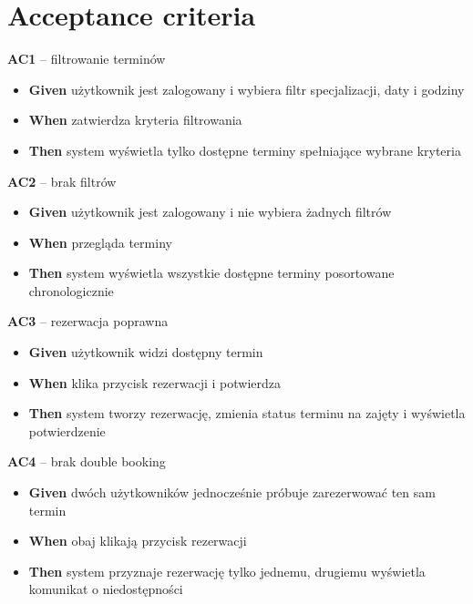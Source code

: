 \documentclass[12pt,a4paper]{article}
\begin{document}
\section{Acceptance criteria}

\textbf{AC1} -- filtrowanie terminów
\begin{itemize}[itemsep=2pt]
  \item \textbf{Given} użytkownik jest zalogowany i wybiera filtr specjalizacji, daty i godziny
  \item \textbf{When} zatwierdza kryteria filtrowania
  \item \textbf{Then} system wyświetla tylko dostępne terminy spełniające wybrane kryteria
\end{itemize}

\vspace{0.4em}
\textbf{AC2} -- brak filtrów
\begin{itemize}[itemsep=2pt]
  \item \textbf{Given} użytkownik jest zalogowany i nie wybiera żadnych filtrów
  \item \textbf{When} przegląda terminy
  \item \textbf{Then} system wyświetla wszystkie dostępne terminy posortowane chronologicznie
\end{itemize}

\vspace{0.4em}
\textbf{AC3} -- rezerwacja poprawna
\begin{itemize}[itemsep=2pt]
  \item \textbf{Given} użytkownik widzi dostępny termin
  \item \textbf{When} klika przycisk rezerwacji i potwierdza
  \item \textbf{Then} system tworzy rezerwację, zmienia status terminu na zajęty i wyświetla potwierdzenie
\end{itemize}

\vspace{0.4em}
\textbf{AC4} -- brak double booking
\begin{itemize}[itemsep=2pt]
  \item \textbf{Given} dwóch użytkowników jednocześnie próbuje zarezerwować ten sam termin
  \item \textbf{When} obaj klikają przycisk rezerwacji
  \item \textbf{Then} system przyznaje rezerwację tylko jednemu, drugiemu wyświetla komunikat o niedostępności
\end{itemize}
\end{document}
